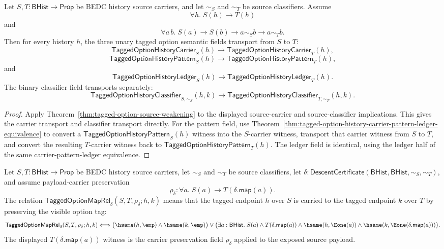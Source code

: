 \begin{theorem}
\label{thm:tagged-option-semantic-fields-source-weakening}
Let $S,T:\mathsf{BHist}\to\mathsf{Prop}$ be BEDC history source carriers, and
let $\sim_S$ and $\sim_T$ be source classifiers. Assume
$$
\forall h.\; S(h)\to T(h)
$$
and
$$
\forall a\,b.\; S(a)\to S(b)\to a\sim_S b\to a\sim_T b.
$$
Then for every history $h$, the three unary tagged option semantic fields
transport from $S$ to $T$:
$$
\mathsf{TaggedOptionHistoryCarrier}_S(h)\to
\mathsf{TaggedOptionHistoryCarrier}_T(h),
$$
$$
\mathsf{TaggedOptionHistoryPattern}_S(h)\to
\mathsf{TaggedOptionHistoryPattern}_T(h),
$$
and
$$
\mathsf{TaggedOptionHistoryLedger}_S(h)\to
\mathsf{TaggedOptionHistoryLedger}_T(h).
$$
The binary classifier field transports separately:
$$
\mathsf{TaggedOptionHistoryClassifier}_{S,\sim_S}(h,k)\to
\mathsf{TaggedOptionHistoryClassifier}_{T,\sim_T}(h,k).
$$
\end{theorem}
\begin{proof}
Apply Theorem~\ref{thm:tagged-option-source-weakening} to the displayed
source-carrier and source-classifier implications. This gives the carrier
transport and classifier transport directly. For the pattern field, use
Theorem~\ref{thm:tagged-option-history-carrier-pattern-ledger-equivalence} to
convert a $\mathsf{TaggedOptionHistoryPattern}_S(h)$ witness into the
$S$-carrier witness, transport that carrier witness from $S$ to $T$, and convert
the resulting $T$-carrier witness back to
$\mathsf{TaggedOptionHistoryPattern}_T(h)$. The ledger field is identical, using
the ledger half of the same carrier-pattern-ledger equivalence.
\end{proof}

\begin{definition}
\label{def:tagged-option-payload-descent-relation}
Let $S,T:\mathsf{BHist}\to\mathsf{Prop}$ be BEDC history source carriers, let
$\sim_S$ and $\sim_T$ be source classifiers, let
$\delta:\mathsf{DescentCertificate}(\mathsf{BHist},\mathsf{BHist},\sim_S,\sim_T)$,
and assume payload-carrier preservation
$$
\rho_{\delta}:\forall a.\;S(a)\to T(\delta.\mathsf{map}(a)).
$$
The relation $\mathsf{TaggedOptionMapRel}_{\delta}(S,T,\rho_{\delta};h,k)$
means that the tagged endpoint $h$ over $S$ is carried to the tagged endpoint
$k$ over $T$ by preserving the visible option tag:
$$
\mathsf{TaggedOptionMapRel}_{\delta}(S,T,\rho_{\delta};h,k)
\Longleftrightarrow
\bigl(\hsame(h,\emp)\land\hsame(k,\emp)\bigr)
\lor
\bigl(\exists a:\mathsf{BHist}.\;
S(a)\land T(\delta.\mathsf{map}(a))\land
\hsame(h,\Eone(a))\land
\hsame(k,\Eone(\delta.\mathsf{map}(a)))\bigr).
$$
The displayed $T(\delta.\mathsf{map}(a))$ witness is the carrier preservation
field $\rho_{\delta}$ applied to the exposed source payload.
\end{definition}

